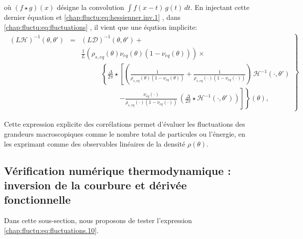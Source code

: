 où \( (f \star g)(x) \) désigne la convolution \( \int f(x - t)\, g(t)\, dt \).
En injectant cette dernier équation et \eqref{chap:fluctu:eq:hessienner.inv.1} , dans \eqref{chap:fluctu:eq:fluctuations} , il vient que une éqution implicite:
\begin{eqnarray}
	\left . \begin{array}{rcl}
		\left( L \mathcal{H} \right)^{-1} (\theta, \theta') & = &\displaystyle (L\mathcal{D})^{-1}(\theta , \theta') + \\&& 	\frac{1}{L} (\rho_{\! s , eq}(\theta) \nu_{\! eq}(\theta) (1 -  \nu_{\! eq}(\theta) )) \times \\
		&& \displaystyle  ~~~~~~~~~~~~~\left \{  \frac{\Delta}{2\pi} \star  \left [ \left (  \frac{1}{\rho_{\! s, eq}(\theta)  (1 - \nu_{\! eq}(\theta)  )} +  \frac{1}{\rho_{\! s, eq}(\cdot) (1 - \nu_{\! eq} (\cdot )  )}\right )  \, \mathcal{H}^{-1}( \cdot , \theta ' )   \right. \right .\\
		&&  \displaystyle  ~~~~~~~~~~~~~~~~~~~~~~~~~\left . \left .   -  \frac{\nu_{\! eq}(\cdot)}{\rho_{\! s, eq}(\cdot) ( 1 - \nu_{\! eq}(\cdot) )}  \, \left ( \frac{\Delta}{2\pi} \star \mathcal{H}^{-1}( \cdot , \theta ' )   \right )  \right ] \right \} (\theta),
	\end{array}\right\} \label{chap:fluctu:eq:fluctuations.10}
\end{eqnarray}


Cette expression explicite des corrélations permet d'évaluer les fluctuations des grandeurs macroscopiques comme le nombre total de particules ou l'énergie, en les exprimant comme des observables linéaires de la densité \( \rho(\theta) \).

\subsection{Vérification numérique thermodynamique : inversion de la courbure et dérivée fonctionnelle}



Dans cette sous-section, nous proposons de tester l’expression \eqref{chap:fluctu:eq:fluctuations.10}.  


